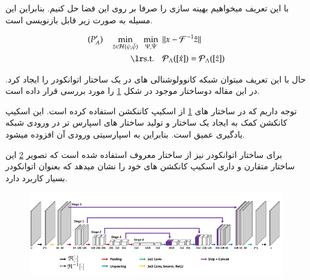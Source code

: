 با این تعریف میخواهیم بهینه سازی را صرفا بر روی این فضا حل کنیم. بنابراین این مسیله به صورت زیر قابل بازنویسی است.

\removevspace
\begin{subequations}\label{eq:P'A}
	\begin{align}
		(P'_A) \quad
		\min_{\hat{z}\in\mathbb{\mathcal{H}(\psi, \tilde{\psi})}} \ \
		\min_{\Psi, \tilde{\Psi}} \ \  & \| x - \F^{-1}{\hat{z}}\| \\
		\lrtext{s.t.} \quad  & \Rho_\Lambda([\hat{x}]) = \Rho_\Lambda([\hat{z}])
	\end{align}
\end{subequations}


حال با این تعریف میتوان شبکه کانوولوشنالی های در یک ساختار اتوانکودر را ایجاد کرد.
در این مقاله دوساختار موجود در شکل 	\ref{fig:kspace2020-architectures}
را مورد بررسی قرار داده است.

\begin{figure}
	\centering
	\label{fig:kspace2020-architectures}
\end{figure}

توجه داریم که در ساختار های \ref{fig:kspace2020-architectures}
از اسکیپ کاننکشن 
استفاده کرده است. این اسکیپ کانکشن کمک به ایجاد یک ساختار  و تولید ساختار های اسپارس تر در ورودی شبکه یادگیری عمیق است. بنابراین به اسپارسیتی ورودی آن افزوده میشود.

برای ساختار اتوانکودر نیز از ساختار معروف  استفاده شده است که تصویر 
\ref{fig:unet}
این ساختار متقارن و داری اسکیپ کانکشن های خود را نشان میدهد که بعنوان اتوانکودر بسیار کاربرد دارد.



\begin{figure}
	\centering
	\includegraphics[width=0.9\linewidth]{chapters/chapter-3/figs/unet}
	\caption{}
	\label{fig:unet}
\end{figure}









